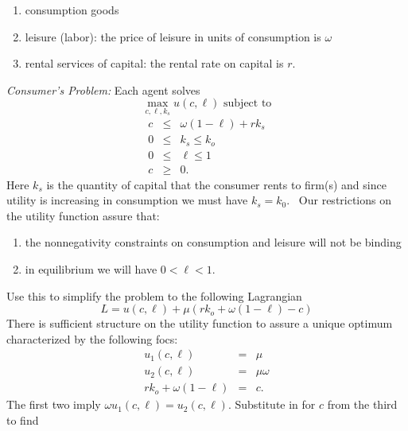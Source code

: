\documentclass{sebase}
\begin{document}
\begin{enumerate}
\item consumption goods

\item leisure (labor): the price of leisure in units of consumption is $%
\omega $

\item rental services of capital: the rental rate on capital is $r.$
\end{enumerate}

\pagebreak

\textit{Consumer's Problem: }Each agent solves%
\begin{equation*}
\underset{c,\ell ,k_{s}}{\max }u(c,\ell )\text{ subject to}
\end{equation*}%
\begin{eqnarray*}
c &\leq &\omega \left( 1-\ell \right) +rk_{s} \\
0 &\leq &k_{s}\leq k_{o} \\
0 &\leq &\ell \leq 1 \\
c &\geq &0.
\end{eqnarray*}%
Here $k_{s}$ is the quantity of capital that the consumer rents to firm(s)
and since utility is increasing in consumption we must have $k_{s}=k_{0}$. \
Our restrictions on the utility function assure that:

\begin{enumerate}
\item the nonnegativity constraints on consumption and leisure will not be
binding

\item in equilibrium we will have $0<\ell <1.$
\end{enumerate}

\pagebreak

Use this to simplify the problem to the following Lagrangian 
\begin{equation*}
L=u(c,\ell )+\mu \left( rk_{o}+\omega \left( 1-\ell \right) -c\right)
\end{equation*}%
There is sufficient structure on the utility function to assure a unique
optimum characterized by the following focs:%
\begin{eqnarray*}
u_{1}(c,\ell ) &=&\mu \\
u_{2}(c,\ell ) &=&\mu \omega \\
rk_{o}+\omega \left( 1-\ell \right) &=&c.
\end{eqnarray*}%
The first two imply $\omega u_{1}(c,\ell )=u_{2}(c,\ell ).$ Substitute in
for $c$ from the third to find
\end{document}
